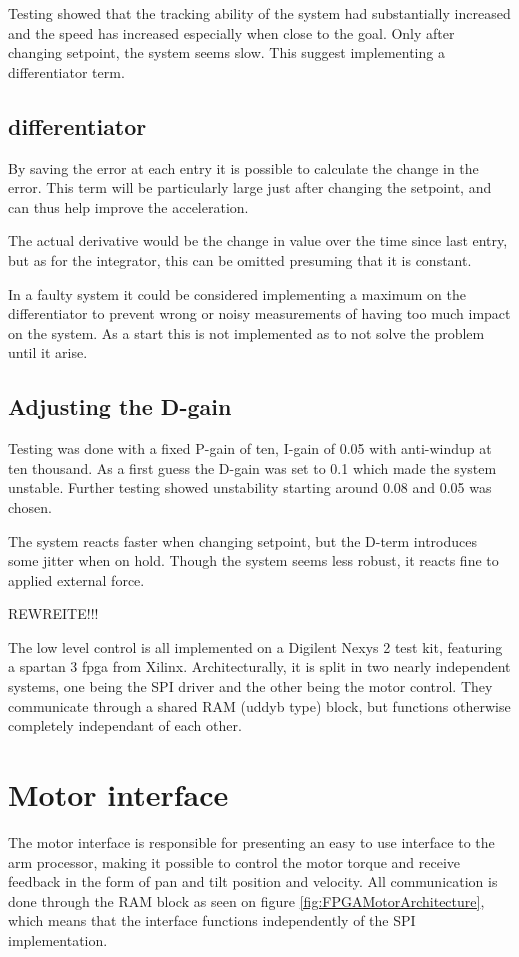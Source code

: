 Testing showed that the tracking ability of the system had substantially increased and the speed has increased especially when close to the goal. Only after changing setpoint, the system seems slow. This suggest implementing a differentiator term.

\subsection{differentiator}
By saving the error at each entry it is possible to calculate the change in the error. This term will be particularly large just after changing the setpoint, and can thus help improve the acceleration.

The actual derivative would be the change in value over the time since last entry, but as for the integrator, this can be omitted presuming that it is constant.

In a faulty system it could be considered implementing a maximum on the differentiator to prevent wrong or noisy measurements of having too much impact on the system. As a start this is not implemented as to not solve the problem until it arise.

\subsection{Adjusting the D-gain}
Testing was done with a fixed P-gain of ten, I-gain of 0.05 with anti-windup at ten thousand. As a first guess the D-gain was set to 0.1 which made the system unstable. Further testing showed unstability starting around 0.08 and 0.05 was chosen.

The system reacts faster when changing setpoint, but the D-term introduces some jitter when on hold. Though the system seems less robust, it reacts fine to applied external force.






REWREITE!!!

The low level control is all implemented on a Digilent Nexys 2 test kit, featuring a spartan 3 fpga from Xilinx.
Architecturally, it is split in two nearly independent systems, one being the SPI driver and the other being the motor control.
They communicate through a shared RAM (uddyb type) block, but functions otherwise completely independant of each other.


\section{Motor interface}
The motor interface is responsible for presenting an easy to use interface to the arm processor, making it possible to control the motor torque and receive feedback in the form of pan and tilt position and velocity.
All communication is done through the RAM block as seen on figure \ref{fig:FPGAMotorArchitecture}, which means that the interface functions independently of the SPI implementation.

